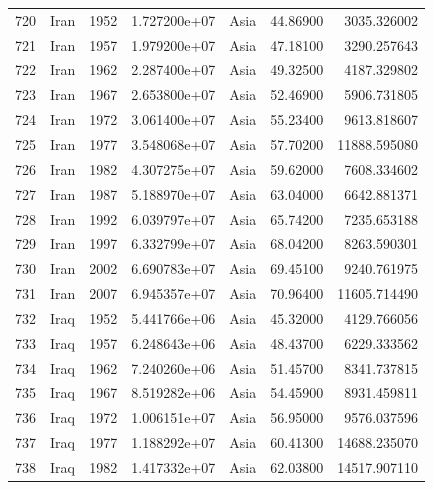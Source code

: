 \documentclass[
  letterpaper,
  DIV=11,
  numbers=noendperiod]{scrreprt}
\begin{document}
\begin{tabular}{llrrlrr}
720  &                      Iran &  1952 &  1.727200e+07 &      Asia &  44.86900 &    3035.326002 \\
721  &                      Iran &  1957 &  1.979200e+07 &      Asia &  47.18100 &    3290.257643 \\
722  &                      Iran &  1962 &  2.287400e+07 &      Asia &  49.32500 &    4187.329802 \\
723  &                      Iran &  1967 &  2.653800e+07 &      Asia &  52.46900 &    5906.731805 \\
724  &                      Iran &  1972 &  3.061400e+07 &      Asia &  55.23400 &    9613.818607 \\
725  &                      Iran &  1977 &  3.548068e+07 &      Asia &  57.70200 &   11888.595080 \\
726  &                      Iran &  1982 &  4.307275e+07 &      Asia &  59.62000 &    7608.334602 \\
727  &                      Iran &  1987 &  5.188970e+07 &      Asia &  63.04000 &    6642.881371 \\
728  &                      Iran &  1992 &  6.039797e+07 &      Asia &  65.74200 &    7235.653188 \\
729  &                      Iran &  1997 &  6.332799e+07 &      Asia &  68.04200 &    8263.590301 \\
730  &                      Iran &  2002 &  6.690783e+07 &      Asia &  69.45100 &    9240.761975 \\
731  &                      Iran &  2007 &  6.945357e+07 &      Asia &  70.96400 &   11605.714490 \\
732  &                      Iraq &  1952 &  5.441766e+06 &      Asia &  45.32000 &    4129.766056 \\
733  &                      Iraq &  1957 &  6.248643e+06 &      Asia &  48.43700 &    6229.333562 \\
734  &                      Iraq &  1962 &  7.240260e+06 &      Asia &  51.45700 &    8341.737815 \\
735  &                      Iraq &  1967 &  8.519282e+06 &      Asia &  54.45900 &    8931.459811 \\
736  &                      Iraq &  1972 &  1.006151e+07 &      Asia &  56.95000 &    9576.037596 \\
737  &                      Iraq &  1977 &  1.188292e+07 &      Asia &  60.41300 &   14688.235070 \\
738  &                      Iraq &  1982 &  1.417332e+07 &      Asia &  62.03800 &   14517.907110 \\

\end{tabular}
\end{document}
